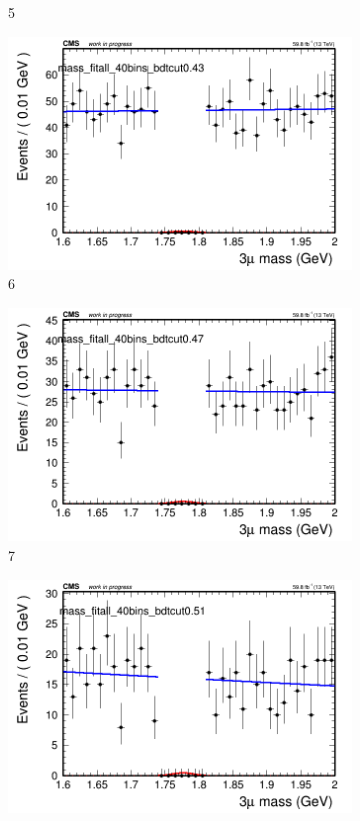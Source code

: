 \begin{figure}[h!]
\begin{subfigure}{0.2\textwidth}
        \caption{5}
    \end{subfigure}
    \begin{subfigure}{0.2\textwidth}
        \includegraphics[width=\textwidth]{unfixed_exp/plots/all/massfit_all_40bins_bdtcut0.43.png}
        \caption{6}
    \end{subfigure}
    \begin{subfigure}{0.2\textwidth}
        \includegraphics[width=\textwidth]{unfixed_exp/plots/all/massfit_all_40bins_bdtcut0.47.png}
        \caption{7}
    \end{subfigure}
    \begin{subfigure}{0.2\textwidth}
        \includegraphics[width=\textwidth]{unfixed_exp/plots/all/massfit_all_40bins_bdtcut0.51.png}

\end{subfigure}
\end{figure}
